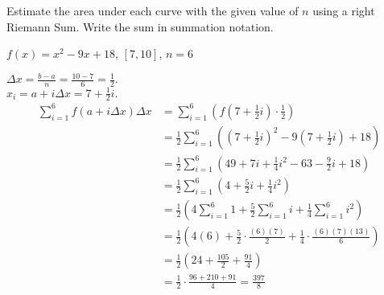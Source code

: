 \documentclass[handout, nooutcomes]{ximera}
\renewenvironment{freeResponse}{
\ifhandout\setbox0\vbox\bgroup\else
\begin{trivlist}\item[\hskip \labelsep\bfseries Solution:\hspace{2ex}]
\fi}
{\ifhandout\egroup\else
\end{trivlist}
\fi}
\begin{document}
\begin{problem}
Estimate the area under each curve with the given value of $n$ using a right Riemann Sum. Write the sum in summation notation.
	\begin{enumerate}
	\item  $f(x) = x^2 - 9x + 18$, \; $[7,10]$, \; $n=6$
		\begin{freeResponse}
		$\Delta x=\frac{b-a}{n}=\frac{10-7}{6}=\frac{1}{2}.$  \\
		$x_i =a+i\Delta x=7+\frac{1}{2}i.$  
		\begin{align*}
		\sum_{i=1}^{6} f(a + i \Delta x) \Delta x &= \sum_{i=1}^{6} \left( f \left( 7 + \frac{1}{2} i \right) \cdot \frac{1}{2} \right)  \\
		&= \frac{1}{2} \sum_{i=1}^{6} \left( \left( 7 + \frac{1}{2} i \right)^2 - 9 \left( 7 + \frac{1}{2} i \right) + 18 \right) \\
		&= \frac{1}{2} \sum_{i=1}^{6} \left( 49 + 7i + \frac{1}{4} i^2 - 63 - \frac{9}{2} i + 18 \right) \\
		&= \frac{1}{2} \sum_{i=1}^{6} \left( 4 + \frac{5}{2} i + \frac{1}{4} i^2 \right) \\
		&= \frac{1}{2} \left( 4 \sum_{i=1}^{6} 1 + \frac{5}{2} \sum_{i=1}^{6} i + \frac{1}{4} \sum_{i=1}^{6} i^2 \right) \\
		&= \frac{1}{2} \left( 4(6) + \frac{5}{2} \cdot \frac{(6)(7)}{2} + \frac{1}{4} \cdot \frac{(6)(7)(13)}{6} \right) \\
		&= \frac{1}{2} \left( 24 + \frac{105}{2} + \frac{91}{4} \right) \\
		&= \frac{1}{2} \cdot \frac{96 + 210 + 91}{4} = \frac{397}{8}
		\end{align*}
		\end{freeResponse}
		
		
		

\end{enumerate}
\end{problem}
\end{document}
